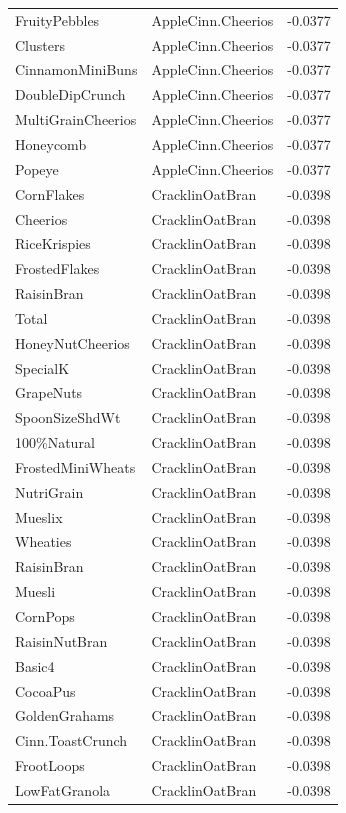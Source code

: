 \begin{table}[!htbp]
\begin{tabular}{lll}
FruityPebbles & AppleCinn.Cheerios & -0.0377
\\
Clusters & AppleCinn.Cheerios & -0.0377
\\
CinnamonMiniBuns & AppleCinn.Cheerios & -0.0377
\\
DoubleDipCrunch & AppleCinn.Cheerios & -0.0377
\\
MultiGrainCheerios & AppleCinn.Cheerios & -0.0377
\\
Honeycomb & AppleCinn.Cheerios & -0.0377
\\
Popeye & AppleCinn.Cheerios & -0.0377
\\
CornFlakes & CracklinOatBran & -0.0398
\\
Cheerios & CracklinOatBran & -0.0398
\\
RiceKrispies & CracklinOatBran & -0.0398
\\
FrostedFlakes & CracklinOatBran & -0.0398
\\
RaisinBran & CracklinOatBran & -0.0398
\\
Total & CracklinOatBran & -0.0398
\\
HoneyNutCheerios & CracklinOatBran & -0.0398
\\
SpecialK & CracklinOatBran & -0.0398
\\
GrapeNuts & CracklinOatBran & -0.0398
\\
SpoonSizeShdWt & CracklinOatBran & -0.0398
\\
100\%Natural & CracklinOatBran & -0.0398
\\
FrostedMiniWheats & CracklinOatBran & -0.0398
\\
NutriGrain & CracklinOatBran & -0.0398
\\
Mueslix & CracklinOatBran & -0.0398
\\
Wheaties & CracklinOatBran & -0.0398
\\
RaisinBran & CracklinOatBran & -0.0398
\\
Muesli & CracklinOatBran & -0.0398
\\
CornPops & CracklinOatBran & -0.0398
\\
RaisinNutBran & CracklinOatBran & -0.0398
\\
Basic4 & CracklinOatBran & -0.0398
\\
CocoaPus & CracklinOatBran & -0.0398
\\
GoldenGrahams & CracklinOatBran & -0.0398
\\
Cinn.ToastCrunch & CracklinOatBran & -0.0398
\\
FrootLoops & CracklinOatBran & -0.0398
\\
LowFatGranola & CracklinOatBran & -0.0398

\end{tabular}
\end{table}
